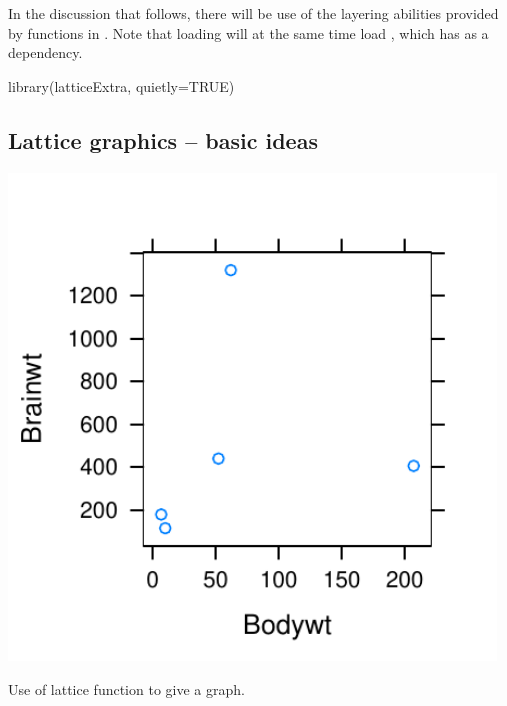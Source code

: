 In the discussion that follows, there will be use of the layering
abilities provided by functions in .  Note that
loading  will at the same time load ,
which  has as a dependency.
\begin{Schunk}
\begin{Sinput}
library(latticeExtra, quietly=TRUE)
\end{Sinput}
\end{Schunk}

\subsection{Lattice graphics -- basic ideas}\label{ss:lat-gph}

\begin{marginfigure}
\begin{Schunk}


\centerline{\includegraphics[width=0.97\textwidth]{figs/07-cline-gph-1} }

\end{Schunk}
\caption{Use of lattice function  to give a graph.
  \label{fig:lat-gph}}
\end{marginfigure}

